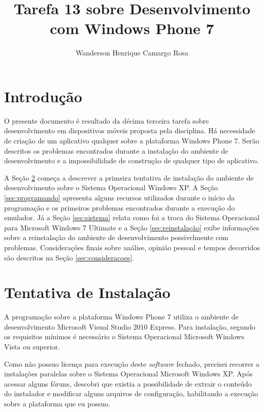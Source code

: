 \documentclass{article}
\title{Tarefa 13 sobre Desenvolvimento com Windows Phone 7}
\author{Wanderson Henrique Camargo Rosa\inst{1}}
\begin{document}
\maketitle{}

\section{Introdução}
\label{sec:introducao}

O presente documento é resultado da décima terceira tarefa sobre desenvolvimento
em dispositivos móveis proposta pela disciplina. Há necessidade de criação de um
aplicativo qualquer sobre a plataforma Windows Phone 7. Serão descritos os
problemas encontrados durante a instalação do ambiente de desenvolvimento e a
impossibilidade de construção de qualquer tipo de aplicativo.

A Seção \ref{sec:tentativa} começa a descrever a primeira tentativa de
instalação do ambiente de desenvolvimento sobre o Sistema Operacional Windows
XP. A Seção \ref{sec:programando} apresenta alguns recursos utilizados durante o
início da programação e os primeiros problemas encontrados durante a execução do
emulador. Já a Seção \ref{sec:sistema} relata como foi a troca do Sistema
Operacional para Microsoft Windows 7 Ultimate e a Seção \ref{sec:reinstalação}
exibe informações sobre a reinstalação do ambiente de desenvolvimento
possivelmente com problemas. Considerações finais sobre análise, opinião pessoal
e tempos decorridos são descritos na Seção \ref{sec:consideracoes}.

\section{Tentativa de Instalação}
\label{sec:tentativa}

A programação sobre a plataforma Windows Phone 7 utiliza o ambiente de
desenvolvimento Microsoft Visual Studio 2010 Express. Para instalação, segundo
os requisitos mínimos é necessário o Sistema Operacional Microsoft Windows Vista
ou superior.

Como não possuo licença para execução deste \textit{software} fechado, precisei
recorrer a instalações paralelas sobre o Sistema Operacional Microsoft Windows
XP. Após acessar alguns fóruns, descobri que existia a possibilidade de extrair
o conteúdo do instalador e modificar alguns arquivos de configuração,
habilitando a execução sobre a plataforma que eu possuo.
\end{document}
